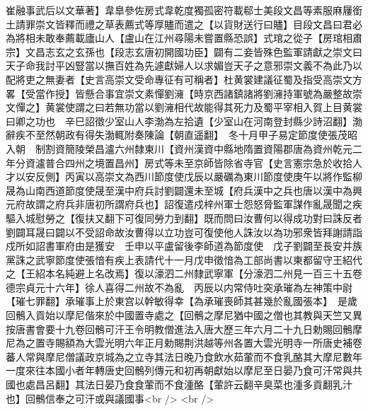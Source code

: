 崔融事武后以文華著】韋臯參佐房式韋乾度獨孤密符載郗士美段文昌等素服麻屨銜土請罪崇文皆釋而禮之草表薦式等厚贐而遣之【以貨財送行曰贐】目段文昌曰君必為將相未敢奉薦載廬山人【盧山在江州尋陽未嘗置縣恐誤】式琯之從子【房琯相肅宗】文昌志玄之玄孫也【段志玄唐初開國功臣】闢有二妾皆殊色監軍請獻之崇文曰天子命我討平凶豎當以撫百姓為先遽獻婦人以求媚豈天子之意邪崇文義不為此乃以配將吏之無妻者【史言高崇文受命專征有可稱者】杜黄裳建議征蜀及指受高崇文方畧【受當作授】皆懸合事宜崇文素憚劉澭【時京西諸鎮諸將劉澭持軍號為嚴整故崇文憚之】黄裳使謂之曰若無功當以劉澭相代故能得其死力及蜀平宰相入賀上目黄裳曰卿之功也　辛巳詔徵少室山人李渤為左拾遺【少室山在河南登封縣少詩沼翻】渤辭疾不至然朝政有得失渤輒附奏陳論【朝直遥翻】　冬十月甲子易定節度使張茂昭入朝　制割資簡陵榮昌瀘六州隸東川【資州漢資中縣地隋置資陽郡唐為資州乾元二年分資瀘普合四州之境置昌州】房式等未至京師皆除省寺官【史言憲宗急於收拾人才以安反側】丙寅以高崇文為西川節度使戊辰以嚴礪為東川節度使庚午以將作監柳晟為山南西道節度使晟至漢中府兵討劉闢還未至城【府兵漢中之兵也唐以漢中為興元府故謂之府兵非唐初所謂府兵也】詔復遣戍梓州軍士怨怒脅監軍謀作亂晟聞之疾驅入城慰勞之【復扶又翻下可復同勞力到翻】既而問曰汝曹何以得成功對曰誅反者劉闢耳晟曰闢以不受詔命故汝曹得以立功豈可復使他人誅汝以為功邪衆皆拜謝請詣戍所如詔書軍府由是獲安　壬申以平盧留後李師道為節度使　戊子劉闢至長安并族黨誅之武寧節度使張愔有疾上表請代十一月戊申徵愔為工部尚書以東都留守王紹代之【王紹本名純避上名改焉】復以濠泗二州隸武寧軍【分濠泗二州見一百三十五卷德宗貞元十六年】徐人喜得二州故不為亂　丙辰以内常侍吐突承璀為左神策中尉【璀七罪翻】承璀事上於東宫以幹敏得幸【為承璀喪師其甚幾於亂國張本】　是歲回鶻入貢始以摩尼偕來於中國置寺處之【回鶻之摩尼猶中國之僧也其教與天竺又異按唐書會要十九卷回鶻可汗王令明教僧進法入唐大歷三年六月二十九日勅賜回鶻摩尼為之置寺賜額為大雲光明六年正月勅賜荆洪越等州各置大雲光明寺一所唐史補卷蕃人常與摩尼僧議政京城為之立寺其法日晚乃食飲水茹葷而不食乳酪其大摩尼數年一度來往本國小者年轉唐史回鶻列傳元和初再朝獻始以摩尼至日晏乃食可汗常與共國也處昌呂翻】其法日晏乃食食葷而不食湩酪【葷許云翻辛臭菜也湩多貢翻乳汁也】回鶻信奉之可汗或與議國事<br />
<br />
